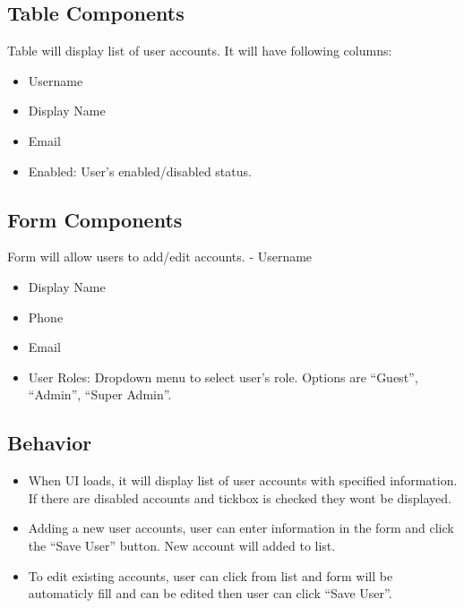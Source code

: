 \documentclass[
]{article}
\begin{document}
\hypertarget{table-components}{%
\subsection{Table Components}\label{table-components}}

Table will display list of user accounts. It will have following
columns:

\begin{itemize}
\item
  Username
\item
  Display Name
\item
  Email
\item
  Enabled: User's enabled/disabled status.
\end{itemize}

\hypertarget{form-components}{%
\subsection{Form Components}\label{form-components}}

Form will allow users to add/edit accounts. - Username

\begin{itemize}
\item
  Display Name
\item
  Phone
\item
  Email
\item
  User Roles: Dropdown menu to select user's role. Options are
  ``Guest'', ``Admin'', ``Super Admin''.
\end{itemize}

\hypertarget{behavior}{%
\subsection{Behavior}\label{behavior}}

\begin{itemize}
\item
  When UI loads, it will display list of user accounts with specified
  information. If there are disabled accounts and tickbox is checked
  they wont be displayed.
\item
  Adding a new user accounts, user can enter information in the form and
  click the ``Save User'' button. New account will added to list.
\item
  To edit existing accounts, user can click from list and form will be
  automaticly fill and can be edited then user can click ``Save User''.
\end{itemize}
\end{document}
